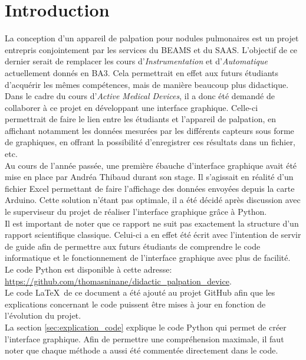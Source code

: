 \section{Introduction}
La conception d'un appareil de palpation pour nodules pulmonaires est un projet entrepris conjointement par les services du BEAMS et du SAAS. L'objectif de ce dernier serait de remplacer les cours d'\textit{Instrumentation} et d'\textit{Automatique} actuellement donnés en BA3. Cela permettrait en effet aux futurs étudiants d'acquérir les mêmes compétences, mais de manière beaucoup plus didactique.\\

Dans le cadre du cours d'\textit{Active Medical Devices}, il a donc été demandé de collaborer à ce projet en développant une interface graphique. Celle-ci permettrait de faire le lien entre les étudiants et l'appareil de palpation, en affichant notamment les données mesurées par les différents capteurs sous forme de graphiques, en offrant la possibilité d'enregistrer ces résultats dans un fichier, etc.\\

Au cours de l'année passée, une première ébauche d'interface graphique avait été mise en place par Andréa Thibaud durant son stage. Il s'agissait en réalité d'un fichier Excel permettant de faire l'affichage des données envoyées depuis la carte Arduino. Cette solution n'étant pas optimale, il a été décidé après discussion avec le superviseur du projet de réaliser l'interface graphique grâce à Python.\\

Il est important de noter que ce rapport ne suit pas exactement la structure d'un rapport scientifique classique. Celui-ci a en effet été écrit avec l'intention de servir de guide afin de permettre aux futurs étudiants de comprendre le code informatique et le fonctionnement de l'interface graphique avec plus de facilité.\\

Le code Python est disponible à cette adresse: \url{https://github.com/thomasninane/didactic_palpation_device}.\\

Le code \LaTeX\ de ce document a été ajouté au projet GitHub afin que les explications concernant le code puissent être mises à jour en fonction de l'évolution du projet.\\

La section \ref{sec:explication_code} explique le code Python qui permet de créer l'interface graphique. Afin de permettre une compréhension maximale, il faut noter que chaque méthode a aussi été commentée directement dans le code.

